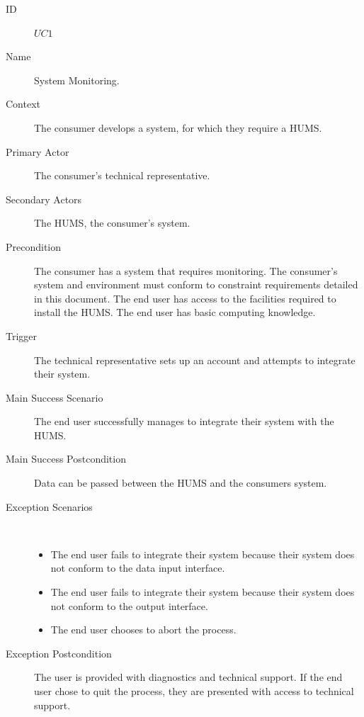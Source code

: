 \documentclass[10pt,a4paper]{article}
\begin{document}
\begin{description}
	\item[ID] $UC1$
	\item[Name]  System Monitoring.
	\item[Context] The consumer develops a system, for which they
	               require a HUMS.
	\item[Primary Actor] The consumer's technical representative.
	\item[Secondary Actors] The HUMS, the consumer's system.
	\item[Precondition] The consumer has a system that requires monitoring.
	                    The consumer's system and environment must conform to constraint
	                     requirements detailed in this document. The
	                    end user has access to the facilities required to install
	                    the HUMS. The end user has basic computing knowledge.
	\item[Trigger] The technical representative sets up an account and attempts to integrate
	               their system.
	\item[Main Success Scenario] The end user successfully manages to integrate
			their system with the HUMS.
	\item[Main Success Postcondition] Data can be passed between the HUMS and the 
					consumers system.
	\item[Exception Scenarios] ~
			\begin{itemize}
				\item The end user fails to integrate their system because
				      their system does not conform to the data input interface.
				\item The end user fails to integrate their system because
				      their system does not conform to the output interface.
				\item The end user chooses to abort the process.
			\end{itemize}
	\item[Exception Postcondition]
			The user is provided with diagnostics and technical support. 
			If the end user chose to quit the process, they are
			presented with access to technical support.
\end{description}

\vspace{\baselineskip}
\end{document}

